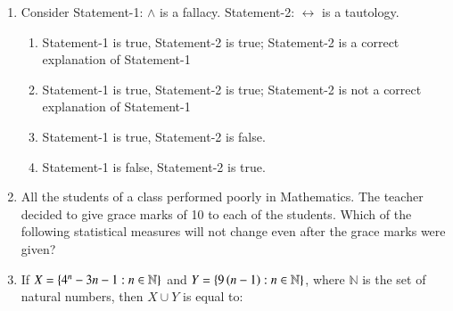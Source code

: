 \documentclass[journal,12pt,twocolumn]{IEEEtran}
\theoremstyle{remark}
\begin{document}
\begin{enumerate}
    \item Consider \newline
 Statement-1:  $\land$  is a fallacy. \newline
Statement-2:  $\leftrightarrow$  is a tautology.

    \hfill{}
    \begin{enumerate}
        \item Statement-1 is true, Statement-2 is true; Statement-2 is a correct explanation of Statement-1
        \item Statement-1 is true, Statement-2 is true; Statement-2 is not a correct explanation of Statement-1
        \item Statement-1 is true, Statement-2 is false.
        \item Statement-1 is false, Statement-2 is true.
    \end{enumerate}
    
    \item All the students of a class performed poorly in Mathematics. The teacher decided to give grace marks of 10 to each of the students. Which of the following statistical measures will not change even after the grace marks were given?
    
    \hfill{}
    \begin{enumerate}
    \end{enumerate}
    
    \item If $X = \left\{4^n - 3n - 1 : n \in \mathbb{N}\right\}$ and $Y = \left\{9 \left(n - 1\right) : n \in \mathbb{N}\right\}$, where $\mathbb{N}$ is the set of natural numbers, then $X \cup Y$ is equal to:
    
    \hfill{}
    \begin{enumerate}
    \end{enumerate}
    

\end{enumerate}
\end{document}
